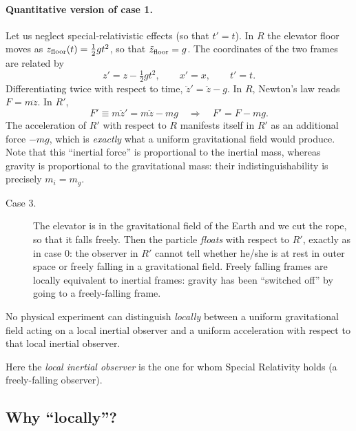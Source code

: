 \paragraph{Quantitative version of case 1.} Let us neglect special-relativistic effects (so that $t'=t$). In $R$ the elevator floor moves as $z_{\rm floor}(t)=\tfrac12 g t^2$, so that $\ddot z_{\rm floor}=g$. The coordinates of the two frames are related by
\begin{equation}
  z' = z-\tfrac12 g t^2,\qquad x'=x,\qquad t'=t .
\end{equation}
Differentiating twice with respect to time, $\ddot z'=\ddot z-g$. In $R$, Newton's law reads $F=m\ddot z$. In $R'$,
\begin{equation}
  F' \equiv m\ddot z' = m\ddot z - mg \quad\Longrightarrow\quad F' = F - mg .
\end{equation}
The acceleration of $R'$ with respect to $R$ manifests itself in $R'$ as an additional force $-mg$, which is \emph{exactly} what a uniform gravitational field would produce. Note that this ``inertial force'' is proportional to the inertial mass, whereas gravity is proportional to the gravitational mass: their indistinguishability is precisely $m_i=m_g$.

\begin{description}
  \item[Case 3.] The elevator is in the gravitational field of the Earth and we cut the rope, so that it falls freely. Then the particle \emph{floats} with respect to $R'$, exactly as in case 0: the observer in $R'$ cannot tell whether he/she is at rest in outer space or freely falling in a gravitational field. Freely falling frames are locally equivalent to inertial frames: gravity has been ``switched off'' by going to a freely-falling frame.
\end{description}

\begin{keyresult}
No physical experiment can distinguish \emph{locally} between a uniform gravitational field acting on a local inertial observer and a uniform acceleration with respect to that local inertial observer.

Here the \emph{local inertial observer} is the one for whom Special Relativity holds (a freely-falling observer).
\end{keyresult}

\subsection{Why ``locally''?}

